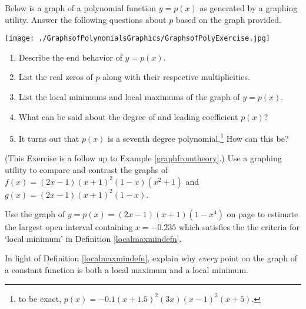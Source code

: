 \documentclass{ximera}
\begin{document}
\begin{problem}
Below is a graph of  a polynomial function $y = p(x)$ as generated by a graphing utility.   Answer the following questions about $p$ based on the graph provided.

\centerline{\texttt{[image: ./GraphsofPolynomialsGraphics/GraphsofPolyExercise.jpg]}}

\begin{enumerate}

\item  Describe the end behavior of $y = p(x)$.

\item  List the real zeros of $p$ along with their respective multiplicities.  

\item  List the local minimums and local maximums of the graph of $y = p(x)$.

\item  What can be said about the degree of and leading coefficient $p(x)$?

\item  It turns out that $p(x)$ is a seventh degree polynomial.\footnote{to be exact, $p(x) = -0.1\left(x+1.5\right)^2\left(3x\right)\left(x-1\right)^3\left(x+5\right)$.}  How can this be?

\end{enumerate}
\end{problem}

\begin{problem}\label{comparegraphfromtheoryexample}  (This Exercise is a follow up to Example \ref{graphfromtheory}.)  Use a graphing utility to  compare and contrast the graphs of $f(x) = (2x-1)(x+1)^2(1-x)(x^2+1)$ and $g(x) = (2x-1)(x+1)^2(1-x)$.
\end{problem}

\begin{problem}  Use the graph of $y= p(x) = (2x-1)(x+1)(1-x^4)$ on page \pageref{localmaxminexample} to estimate the largest open interval containing $x = -0.235$ which satisfies the the criteria for `local minimum'  in Definition \ref{localmaxmindefn}.
\end{problem}

\begin{problem}  In light of Definition \ref{localmaxmindefn}, explain why \textit{every} point on the graph of a constant function is both a local maximum and a local minimum.
\end{problem}
\end{document}
